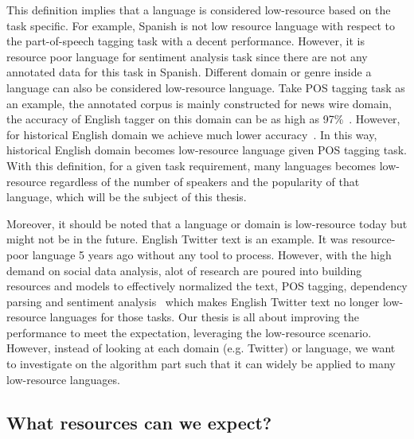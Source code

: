 \documentclass[12pt,twoside,final,hidelinks]{ltthesis}
\theoremstyle{definition}
\begin{document}
This definition implies that a language is considered low-resource based on the task 
specific. For example, Spanish is not low resource language with respect to 
the part-of-speech tagging task with a decent performance. However, it is 
resource poor language for sentiment analysis task 
since  there are not any annotated data for this task in Spanish. 
Different domain or genre inside a language can also be considered low-resource 
language. Take POS tagging task as an example, the annotated corpus is mainly 
constructed for news wire domain, the accuracy of English tagger on this domain 
can be as high as 97\%~\cite{Toutanova:2003}. However, for historical English 
domain we achieve much lower accuracy~\cite{yang-eisenstein:2016:N16-1}. In this way, 
historical English domain becomes low-resource language given POS tagging task. 
With this definition, for a given task requirement, many languages becomes low-
resource regardless of the number of speakers and the popularity of that 
language, which will be the subject of this thesis.%

Moreover, it should be noted that a language or domain is low-resource today but might not be in the future. English Twitter text is an example. It was resource-poor language 5 years ago without any tool to process. However, with the high demand on social data analysis, alot of research are poured into  building resources and models to effectively normalized the text, POS tagging, dependency parsing and sentiment analysis~\cite{han-baldwin:2011:ACL-HLT2011,gimpel-EtAl:2011:ACL-HLT2011,kong-EtAl:2014:EMNLP2014,Agarwal:2011:SAT:2021109.2021114} which makes English Twitter text no longer low-resource languages for those tasks. Our thesis is all about improving the performance to meet the expectation, leveraging the low-resource scenario. However, instead of looking at each domain (e.g. Twitter) or language, we want to investigate on the algorithm part such that it can widely be applied to many low-resource languages.   

\subsection{What resources can we expect?}
\end{document}
